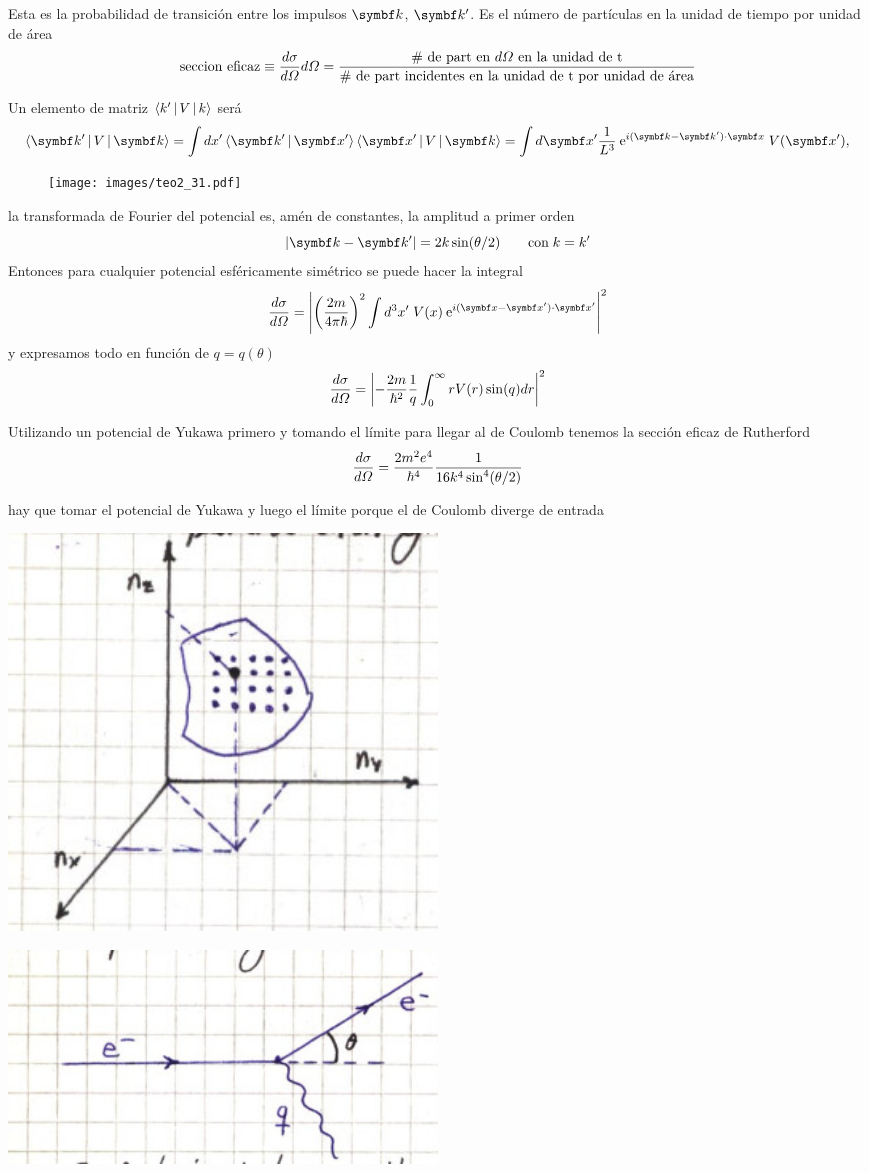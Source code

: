 \documentclass[10pt,oneside]{CBFT_book}
\begin{document}
Esta es la probabilidad de transición entre los impulsos $\vb{k}$, $\vb{k}'$. Es el número de partículas en 
la unidad de tiempo por unidad de área 
\[
	\text{seccion eficaz} \equiv \frac{d^{\hspace{-0.05em}} {\sigma}}{d {\Omega}^{\hspace{-0.05em}}}d\Omega =
	\frac{\text{\# de part en $d\Omega$ en la unidad de t}}
	{\text{\# de part incidentes en la unidad de t por unidad de área}}
\]

Un elemento de matriz $\Braket{k'|V|k}$ será 
\[
	\Braket{\vb{k}'|V|\vb{k}} = \int dx'\Braket{\vb{k}'|\vb{x}'} \Braket{\vb{x}'|V|\vb{k}} =
	\int d\vb{x}' \frac{1}{L^3} \euler^{i (\vb{k}-\vb{k}')\cdot \vb{x}} \; V(\vb{x}'),
\]
\begin{figure}[htb]
	\begin{center}
	\texttt{[image: images/teo2\_31.pdf]}
	\end{center}
	\caption{}
\end{figure} 
la transformada de Fourier del potencial es, amén de constantes, la amplitud a primer orden 
\[
	|\vb{k} - \vb{k}'| = 2k\sin(\theta/2) \qquad \text{con} \; k=k' 
\]
Entonces para cualquier potencial esféricamente simétrico se puede hacer la integral 
\[
	\dtot{\sigma}{\Omega} =
	\left|\left( \frac{2m}{4\pi\hbar}\right)^2 \int d^3x'\;V(x)\euler^{i(\vb{x}-\vb{x}')\cdot\vb{x}'}\right|^2
\]
y expresamos todo en función de $q=q(\theta)$
\[
	\frac{d^{\hspace{-0.05em}} {\sigma}}{d {\Omega}^{\hspace{-0.05em}}} =
	\left| -\frac{2m}{\hbar^2} \frac{1}{q} \int_0^\infty rV(r)\sin(q) dr \right|^2
\]

Utilizando un potencial de Yukawa primero y tomando el límite para llegar al de Coulomb tenemos la sección 
eficaz de Rutherford 
\[
	\frac{d^{\hspace{-0.05em}} {\sigma}}{d {\Omega}^{\hspace{-0.05em}}} = \frac{2m^2e^4}{\hbar^4}\frac{1}{16k^4\sin^4(\theta/2)}
\]

hay que tomar el potencial de Yukawa y luego el límite porque el de Coulomb diverge de entrada

	\includegraphics[width=0.5\textwidth]{images/fig_ft2_scattering_section_2.jpg}
	
	\includegraphics[width=0.5\textwidth]{images/fig_ft2_scattering_section_3.jpg}
		
\end{document}
